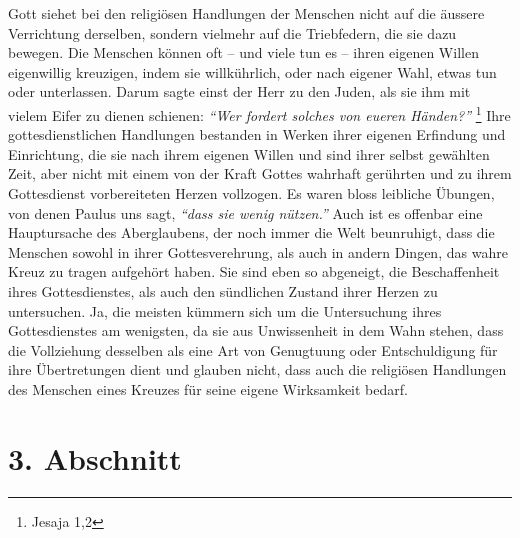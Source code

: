   Gott siehet bei den religiösen
Handlungen der Menschen nicht auf die äussere
Verrichtung derselben, sondern vielmehr auf die Triebfedern, die sie dazu
bewegen.  Die Menschen können oft -- und viele
tun es -- ihren eigenen Willen
eigenwillig kreuzigen, indem sie willkührlich, oder nach eigener Wahl, etwas
tun oder
unterlassen. Darum sagte einst der Herr zu den Juden, als
sie ihm
mit vielem
Eifer zu dienen schienen:
\textit{"`Wer fordert solches von eueren Händen?"'}
\footnote{Jesaja 1,2}
 Ihre
gottesdienstlichen Handlungen bestanden in Werken ihrer eigenen Erfindung und
Einrichtung, die sie nach ihrem eigenen Willen und sind ihrer selbst gewählten
Zeit, aber nicht mit einem von der Kraft Gottes wahrhaft gerührten und zu ihrem
Gottesdienst vorbereiteten Herzen vollzogen. Es waren bloss leibliche Übungen,
von denen
Paulus uns sagt,
\textit{"`dass sie wenig nützen."'} Auch ist es offenbar eine
Hauptursache des Aberglaubens, der noch
immer die Welt beunruhigt, dass die Menschen sowohl in ihrer Gottesverehrung,
als auch in andern Dingen, das wahre Kreuz zu tragen aufgehört haben. Sie sind
eben so abgeneigt, die Beschaffenheit ihres Gottesdienstes, als auch den
sündlichen Zustand ihrer Herzen zu untersuchen. Ja,
die meisten kümmern sich um die Untersuchung ihres Gottesdienstes am
wenigsten, da sie aus Unwissenheit in
dem Wahn stehen, dass die Vollziehung desselben als eine Art von Genugtuung
oder Entschuldigung für ihre Übertretungen dient und glauben nicht, dass auch
die religiösen Handlungen des Menschen eines Kreuzes für seine eigene
Wirksamkeit bedarf.

\section{3. Abschnitt} \label{kap6_ab3}

